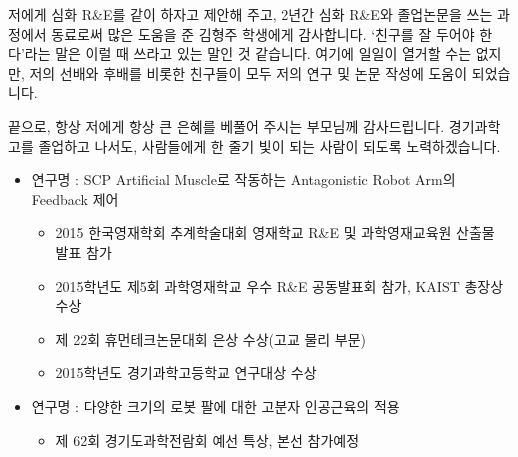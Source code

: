 \begin{acknowledgements}
저에게 심화 R\&E를 같이 하자고 제안해 주고, 2년간 심화 R\&E와 졸업논문을 쓰는 과정에서 동료로써 많은 도움을 준 김형주 학생에게 감사합니다. 
`친구를 잘 두어야 한다'라는 말은 이럴 때 쓰라고 있는 말인 것 같습니다. 여기에 일일이 열거할 수는 없지만, 저의 선배와 후배를 비롯한 친구들이 모두 저의 연구 및 논문 작성에 도움이 되었습니다.

끝으로, 항상 저에게 항상 큰 은혜를 베풀어 주시는 부모님께 감사드립니다. 경기과학고를 졸업하고 나서도, 사람들에게 한 줄기 빛이 되는 사람이 되도록 노력하겠습니다.
\end{acknowledgements}

\begin{researches}
\begin{itemize}
	\item 연구명 : SCP Artificial Muscle로 작동하는 Antagonistic Robot Arm의 Feedback 제어
	\begin{itemize}
		\item 2015 한국영재학회 추계학술대회 영재학교 R\&E 및 과학영재교육원 산출물 발표 참가
		\item 2015학년도 제5회 과학영재학교 우수 R\&E 공동발표회 참가, KAIST 총장상 수상
		\item 제 22회 휴먼테크논문대회 은상 수상(고교 물리 부문)
		\item 2015학년도 경기과학고등학교 연구대상 수상
	\end{itemize}
	\item 연구명 : 다양한 크기의 로봇 팔에 대한 고분자 인공근육의 적용
	\begin{itemize}
		\item 제 62회	경기도과학전람회 예선 특상, 본선 참가예정
	\end{itemize}
\end{itemize}
\end{researches}